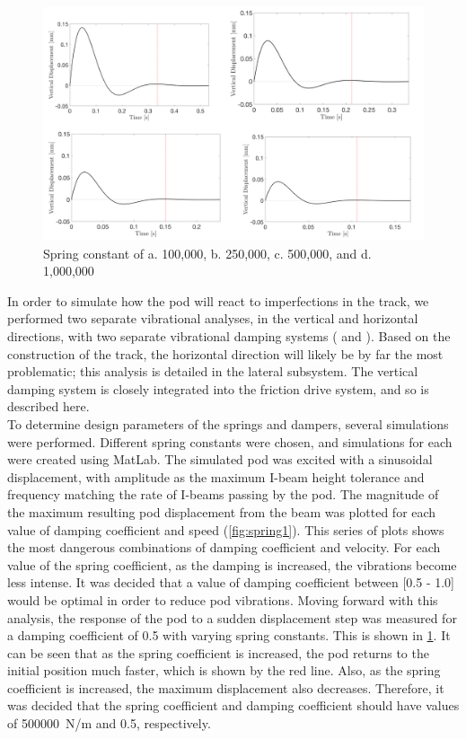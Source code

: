 \documentclass[main.tex]{subfiles}
\begin{document}
    \begin{figure}
        \centering
        \includegraphics[width=\textwidth]{images/fig2}
        \caption{Spring constant of a. 100,000, b. 250,000, c. 500,000, and d. 1,000,000}
        \label{fig:spring2}
    \end{figure}
    In order to simulate how the pod will react to imperfections in the track, we performed two separate vibrational analyses, in the vertical and horizontal directions, with two separate vibrational damping systems ( and ). Based on the construction of the track, the horizontal direction will likely be by far the most problematic; this analysis is detailed in the lateral subsystem. The vertical damping system is closely integrated into the friction drive system, and so is described here.\\

    To determine design parameters of the springs and dampers, several simulations were performed. Different spring constants were chosen, and simulations for each were created using MatLab. The simulated pod was excited with a sinusoidal displacement, with amplitude as the maximum I-beam height tolerance and frequency matching the rate of I-beams passing by the pod. The magnitude of the maximum resulting pod displacement from the beam was plotted for each value of damping coefficient and speed (\ref{fig:spring1}). This series of plots shows the most dangerous combinations of damping coefficient and velocity. For each value of the spring coefficient, as the damping is increased, the vibrations become less intense. It was decided that a value of damping coefficient between [0.5 - 1.0] would be optimal in order to reduce pod vibrations.  Moving forward with this analysis, the response of the pod to a sudden displacement step was measured for a damping coefficient of 0.5 with varying spring constants. This is shown in \ref{fig:spring2}. It can be seen that as the spring coefficient is increased, the pod returns to the initial position much faster, which is shown by the red line. Also, as the spring coefficient is increased, the maximum displacement also decreases. Therefore, it was decided that the spring coefficient and damping coefficient should have values of \SI{500000}{N/m} and 0.5, respectively. \\
\end{document}
